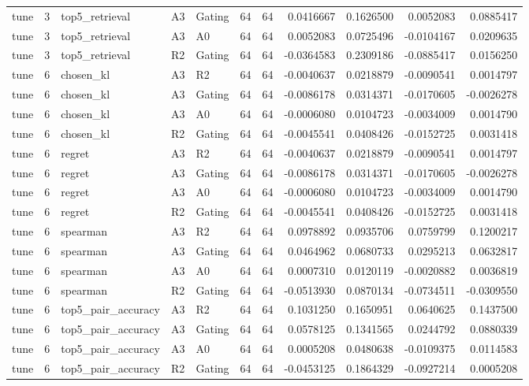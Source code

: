 \begin{tabular}{lrlllrrrrrr}
tune & 3 & top5_retrieval & A3 & Gating & 64 & 64 & 0.0416667 & 0.1626500 & 0.0052083 & 0.0885417 \\
tune & 3 & top5_retrieval & A3 & A0 & 64 & 64 & 0.0052083 & 0.0725496 & -0.0104167 & 0.0209635 \\
tune & 3 & top5_retrieval & R2 & Gating & 64 & 64 & -0.0364583 & 0.2309186 & -0.0885417 & 0.0156250 \\
tune & 6 & chosen_kl & A3 & R2 & 64 & 64 & -0.0040637 & 0.0218879 & -0.0090541 & 0.0014797 \\
tune & 6 & chosen_kl & A3 & Gating & 64 & 64 & -0.0086178 & 0.0314371 & -0.0170605 & -0.0026278 \\
tune & 6 & chosen_kl & A3 & A0 & 64 & 64 & -0.0006080 & 0.0104723 & -0.0034009 & 0.0014790 \\
tune & 6 & chosen_kl & R2 & Gating & 64 & 64 & -0.0045541 & 0.0408426 & -0.0152725 & 0.0031418 \\
tune & 6 & regret & A3 & R2 & 64 & 64 & -0.0040637 & 0.0218879 & -0.0090541 & 0.0014797 \\
tune & 6 & regret & A3 & Gating & 64 & 64 & -0.0086178 & 0.0314371 & -0.0170605 & -0.0026278 \\
tune & 6 & regret & A3 & A0 & 64 & 64 & -0.0006080 & 0.0104723 & -0.0034009 & 0.0014790 \\
tune & 6 & regret & R2 & Gating & 64 & 64 & -0.0045541 & 0.0408426 & -0.0152725 & 0.0031418 \\
tune & 6 & spearman & A3 & R2 & 64 & 64 & 0.0978892 & 0.0935706 & 0.0759799 & 0.1200217 \\
tune & 6 & spearman & A3 & Gating & 64 & 64 & 0.0464962 & 0.0680733 & 0.0295213 & 0.0632817 \\
tune & 6 & spearman & A3 & A0 & 64 & 64 & 0.0007310 & 0.0120119 & -0.0020882 & 0.0036819 \\
tune & 6 & spearman & R2 & Gating & 64 & 64 & -0.0513930 & 0.0870134 & -0.0734511 & -0.0309550 \\
tune & 6 & top5_pair_accuracy & A3 & R2 & 64 & 64 & 0.1031250 & 0.1650951 & 0.0640625 & 0.1437500 \\
tune & 6 & top5_pair_accuracy & A3 & Gating & 64 & 64 & 0.0578125 & 0.1341565 & 0.0244792 & 0.0880339 \\
tune & 6 & top5_pair_accuracy & A3 & A0 & 64 & 64 & 0.0005208 & 0.0480638 & -0.0109375 & 0.0114583 \\
tune & 6 & top5_pair_accuracy & R2 & Gating & 64 & 64 & -0.0453125 & 0.1864329 & -0.0927214 & 0.0005208 \\

\end{tabular}
